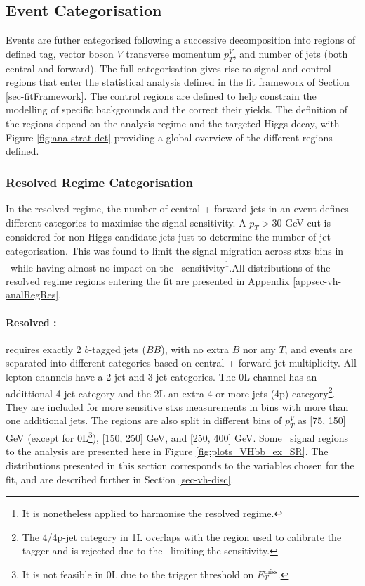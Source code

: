 \subsection{Event Categorisation}\label{sec-eventCat}
Events are futher categorised following a successive decomposition into regions of defined tag, vector boson $V$ transverse momentum $p_T^V$, and number of jets (both central and forward). The full categorisation gives rise to signal and control regions that enter the statistical analysis defined in the fit framework of Section \ref{sec-fitFramework}. The control regions are defined to help constrain the modelling of specific backgrounds and the correct their yields. The definition of the regions depend on the analysis regime and the targeted Higgs decay, with Figure \ref{fig:ana-strat-det} providing a global overview of the different regions defined.

\subsubsection{Resolved Regime Categorisation}
In the resolved regime, the number of central + forward jets in an event defines different categories to maximise the signal sensitivity. A $p_T > 30$ GeV cut is considered for non-Higgs candidate jets just to determine the number of jet categorisation. This was found to limit the signal migration across \gls{stxs} bins in \vhb\ while having almost no impact on the \vhc\ sensitivity\footnote{It is nonetheless applied to harmonise the resolved regime.}.All distributions of the resolved regime regions entering the fit are presented in Appendix \ref{appsec-vh-analRegRes}.

\paragraph{Resolved \vhb:} requires exactly 2 $b$-tagged jets ($BB$), with no extra $B$ nor any $T$, and events are separated into different categories based on central + forward jet multiplicity. All lepton channels have a 2-jet and 3-jet categories. The 0L channel has an addittional 4-jet category and the 2L an extra 4 or more jets (4p) category\footnote{The 4/4p-jet category in 1L overlaps with the region used to calibrate the tagger and is rejected due to the \ttb\ limiting the sensitivity.}. They are included for more sensitive \gls{stxs} measurements in bins with more than one additional jets. The regions are also split in different bins of $p_T^V$ as [75, 150] GeV (except for 0L\footnote{It is not feasible in 0L due to the trigger threshold on $E_T^{\textrm{miss}}$.}), [150, 250] GeV, and [250, 400] GeV. Some \vhb\ signal regions to the analysis are presented here in Figure \ref{fig:plots_VHbb_ex_SR}. The distributions presented in this section corresponds to the variables chosen for the fit, and are described further in Section \ref{sec-vh-disc}.

